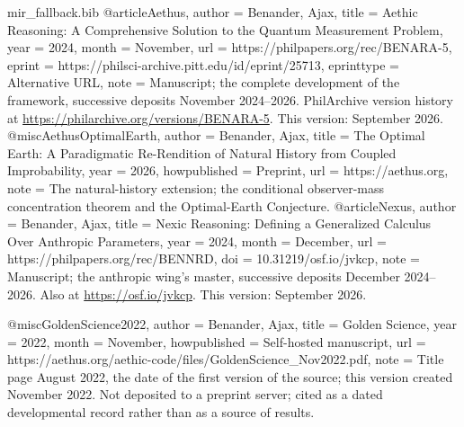 \begin{filecontents}[overwrite]{mir_fallback.bib}
@article{Aethus,
  author      = {Benander, Ajax},
  title       = {Aethic Reasoning: A Comprehensive Solution to the Quantum Measurement Problem},
  year        = {2024},
  month       = {November},
  url         = {https://philpapers.org/rec/BENARA-5},
  eprint      = {https://philsci-archive.pitt.edu/id/eprint/25713},
  eprinttype  = {Alternative URL},
  note        = {Manuscript; the complete development of the framework, successive
                 deposits November 2024--2026. PhilArchive version history at
                 \url{https://philarchive.org/versions/BENARA-5}. This version: September 2026.}
}
@misc{AethusOptimalEarth,
  author       = {Benander, Ajax},
  title        = {The Optimal Earth: A Paradigmatic Re-Rendition of Natural History from Coupled Improbability},
  year         = {2026},
  howpublished = {Preprint},
  url          = {https://aethus.org},
  note         = {The natural-history extension; the conditional observer-mass
                  concentration theorem and the Optimal-Earth Conjecture.}
}
@article{Nexus,
  author      = {Benander, Ajax},
  title       = {Nexic Reasoning: Defining a Generalized Calculus Over Anthropic Parameters},
  year        = {2024},
  month       = {December},
  url         = {https://philpapers.org/rec/BENNRD},
  doi         = {10.31219/osf.io/jvkcp},
  note        = {Manuscript; the anthropic wing's master, successive deposits
                 December 2024--2026. Also at \url{https://osf.io/jvkcp}.
                 This version: September 2026.}
}

@misc{GoldenScience2022,
  author       = {Benander, Ajax},
  title        = {Golden Science},
  year         = {2022},
  month        = {November},
  howpublished = {Self-hosted manuscript},
  url          = {https://aethus.org/aethic-code/files/GoldenScience_Nov2022.pdf},
  note         = {Title page August 2022, the date of the first version of the source; this version created November 2022. Not deposited to a
                  preprint server; cited as a dated developmental record rather than
                  as a source of results.}
}
\end{filecontents}
